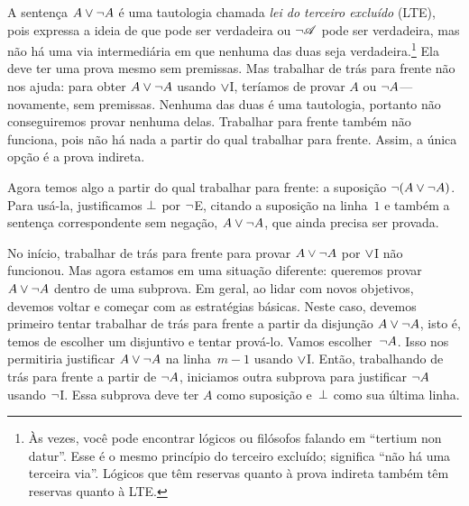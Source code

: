 A sentença $A \vee \neg A$ é uma tautologia chamada \emph{lei do
terceiro excluído} (LTE), pois expressa a ideia de que  pode ser verdadeira ou $\neg \mathscr{A}$ pode ser verdadeira, mas não há uma via intermediária em que nenhuma das duas seja verdadeira.\footnote{Às vezes, você pode encontrar lógicos ou filósofos falando em ``tertium non datur''. Esse é o mesmo princípio do terceiro excluído; significa ``não há uma terceira via''. Lógicos que têm reservas quanto à prova indireta também têm reservas quanto à LTE.} Ela deve ter uma prova mesmo sem premissas. Mas trabalhar de trás para frente não nos ajuda: para obter $A \vee \neg A$ usando $\vee$I, teríamos de provar $A$ ou $\neg A$---novamente, sem premissas. Nenhuma das duas é uma tautologia, portanto não conseguiremos provar nenhuma delas. Trabalhar para frente também não funciona, pois não há nada a partir do qual trabalhar para frente. Assim, a única opção é a prova indireta.
\begin{fitchproof}
	\open
	\AS
	\ellipsesline
	\close
\end{fitchproof}
Agora temos algo a partir do qual trabalhar para frente: a suposição $\neg(A \vee \neg A)$. Para usá-la, justificamos $\bot$ por $\neg$E, citando a suposição na linha~$1$ e também a sentença correspondente sem negação, $A \vee \neg A$, que ainda precisa ser provada.
\begin{fitchproof}
	\open
	\AS
	\ellipsesline
	\close
\end{fitchproof}
No início, trabalhar de trás para frente para provar $A \vee\neg A$ por $\vee$I não funcionou. Mas agora estamos em uma situação diferente: queremos provar $A \vee\neg A$ dentro de uma subprova. Em geral, ao lidar com novos objetivos, devemos voltar e começar com as estratégias básicas. Neste caso, devemos primeiro tentar trabalhar de trás para frente a partir da disjunção $A \vee \neg A$, isto é, temos de escolher um disjuntivo e tentar prová-lo. Vamos escolher~$\neg A$. Isso nos permitiria justificar $A \vee \neg A$ na linha~$m - 1$ usando $\vee$I. Então, trabalhando de trás para frente a partir de $\neg A$, iniciamos outra subprova para justificar $\neg A$ usando $\neg$I. Essa subprova deve ter $A$ como suposição e~$\bot$ como sua última linha.
\begin{fitchproof}
	\open
	\AS
	\open
	\AS
	\ellipsesline
	\close
	\close
\end{fitchproof}
